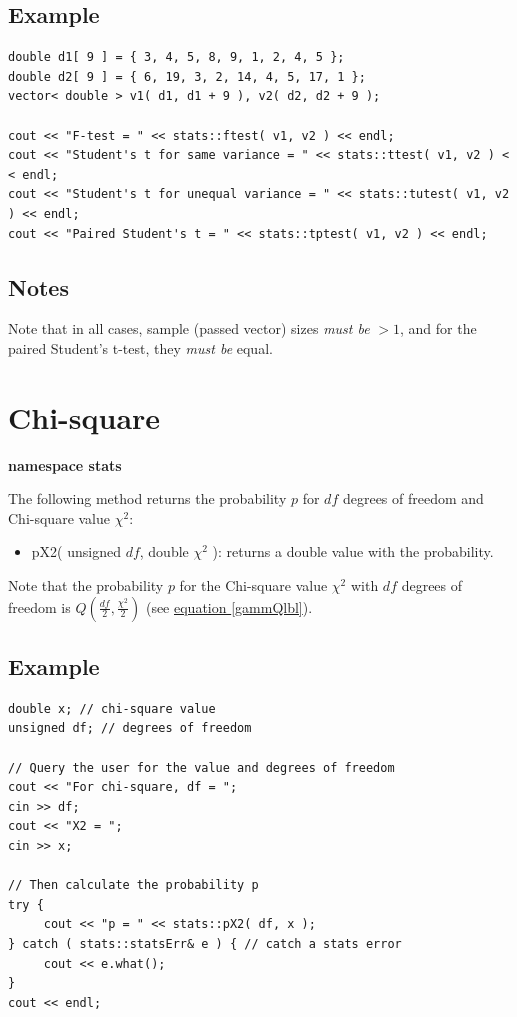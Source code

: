 \documentclass{report}
\begin{document}
\subsection{Example}
\begin{verbatim}
double d1[ 9 ] = { 3, 4, 5, 8, 9, 1, 2, 4, 5 };
double d2[ 9 ] = { 6, 19, 3, 2, 14, 4, 5, 17, 1 };
vector< double > v1( d1, d1 + 9 ), v2( d2, d2 + 9 );

cout << "F-test = " << stats::ftest( v1, v2 ) << endl;
cout << "Student's t for same variance = " << stats::ttest( v1, v2 ) <
< endl;
cout << "Student's t for unequal variance = " << stats::tutest( v1, v2
) << endl;
cout << "Paired Student's t = " << stats::tptest( v1, v2 ) << endl;
\end{verbatim}

\subsection{Notes}
Note that in all cases, sample (passed vector) sizes {\em must be}
$>1$, and
for the paired Student's t-test, they {\em must be} equal.

\section{Chi-square}

{\bf namespace stats}

The following method returns the probability $p$ for $df$ degrees of
freedom and Chi-square value $\chi^2$:

\begin{itemize}
\item pX2( unsigned $df$, double $\chi^2$ ): returns a double value
      with the probability.
\end{itemize}

Note that the probability $p$ for the Chi-square value $\chi^2$ with
$df$ degrees of freedom is $Q(\frac{df}{2},\frac{\chi^2}{2})$ (see
\hyperref[gammQlbl]{equation \ref{gammQlbl}}).

\subsection{Example}
\begin{verbatim}
double x; // chi-square value
unsigned df; // degrees of freedom

// Query the user for the value and degrees of freedom
cout << "For chi-square, df = ";
cin >> df;
cout << "X2 = ";
cin >> x;

// Then calculate the probability p
try {
     cout << "p = " << stats::pX2( df, x );
} catch ( stats::statsErr& e ) { // catch a stats error
     cout << e.what();
}
cout << endl;
\end{verbatim}
\end{document}
